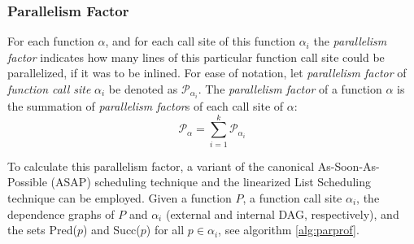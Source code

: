 \documentclass[12pt,twoside]{article}
\begin{document}
\subsubsection{Parallelism Factor}
	For each function $\alpha$, and for each call site of this function $\alpha_i$ the \emph{parallelism factor} indicates how many lines of this particular function call site could be parallelized, if it was to be inlined. For ease of notation, let \emph{parallelism factor} of \emph{function call site} $\alpha_i$ be denoted as $\mathcal{P}_{\alpha_i}$. The \emph{parallelism factor} of a function $\alpha$ is the summation of \emph{parallelism factor}s of each call site of $\alpha$:
	\begin{equation}
	\mathcal{P}_{\alpha} = \sum_{i=1}^k \mathcal{P}_{\alpha_i} 
	\end{equation}

	To calculate this parallelism factor, a variant of the canonical As-Soon-As-Possible (ASAP) scheduling technique and the linearized List Scheduling technique can be employed. Given a function $P$, a function call site $\alpha_i$, the dependence graphs of $P$ and $\alpha_i$ (external and internal DAG, respectively), and the sets Pred($p$) and Succ($p$) for all $p \in \alpha_i$, see algorithm \ref{alg:parprof}.
\end{document}
